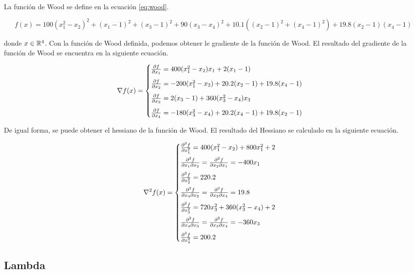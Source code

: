 La función de Wood se define en la ecuación \ref{eq:wood}.

\changefontsizes{10pt}
\begin{equation}
    f(x) = 100(x_1^2-x_2)^2+(x_1-1)^2+(x_3-1)^2+90(x_3-x_4)^2 +10.1((x_2-1)^2+(x_4-1)^2)+19.8(x_2-1)(x_4-1) \label{eq:wood}
\end{equation}
\normalsize

donde $x\in \mathbb{R}^4$. Con la función de Wood definida, podemos obtener le gradiente de la función de Wood. El resultado del gradiente de la función de Wood se encuentra en la siguiente ecuación.

\begin{equation}
    \nabla f(x) = \begin{cases}
        \frac{\partial f}{\partial x_1}=400(x_1^2-x_2)x_1 +2(x_1-1)             \\[0.25cm]
        \frac{\partial f}{\partial x_2}=-200(x_1^2-x_2)+20.2(x_2-1)+19.8(x_4-1) \\[0.25cm]
        \frac{\partial f}{\partial x_3}=2(x_3-1)+360(x_3^2-x_4)x_3              \\[0.25cm]
        \frac{\partial f}{\partial x_4}=-180(x_3^2-x_4)+20.2(x_4-1)+19.8(x_2-1)
    \end{cases} \label{eq:wood_gradient}
\end{equation}

De igual forma, se puede obtener el hessiano de la función de Wood. El resultado del Hessiano se calculado en la siguiente ecuación.

\begin{equation}
    \nabla^2 f(x) = \begin{cases}
        \frac{\partial^2 f}{\partial x_1^2} = 400(x_1^2-x_2)+800x_1^2+2             \\[0.25cm]
        \frac{\partial^2 f}{\partial x_1 \partial x_2} =\frac{\partial^2 f}{\partial x_2 \partial x_1} = -400x_1 \\[0.25cm]
        \frac{\partial^2 f}{\partial x_2^2} = 220.2                                 \\[0.25cm]
        \frac{\partial^2 f}{\partial x_4 \partial x_2} = \frac{\partial^2 f}{\partial x_2 \partial x_4} = 19.8   \\[0.25cm]
        \frac{\partial^2 f}{\partial x_3^2} = 720x_3^2+360(x_3^2-x_4)+2             \\[0.25cm]
        \frac{\partial^2 f}{\partial x_4 \partial x_3}=\frac{\partial^2 f}{\partial x_3 \partial x_4} = -360x_3  \\[0.25cm]
        \frac{\partial^2 f}{\partial x_4^2} = 200.2
    \end{cases} \label{eq:wood_hessian}
\end{equation}

\subsection*{Lambda}

